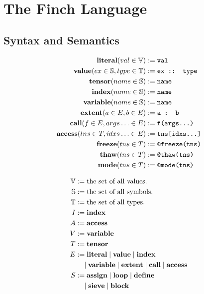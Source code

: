 
\section{The Finch Language}

\subsection{Syntax and Semantics}

\noindent %
\begin{minipage}{0.4\linewidth}
\begin{align*}
    \text{\textbf{literal}}(val \in \mathbb{V}) &:= \text{\texttt{val}} \\
    \text{\textbf{value}}(ex \in \mathbb{S}, type \in \mathbb{T}) &:= \text{\texttt{ex :: type}} \\
    \text{\textbf{tensor}}(name \in \mathbb{S}) &:= \text{\texttt{name}} \\
    \text{\textbf{index}}(name \in \mathbb{S}) &:= \text{\texttt{name}} \\
    \text{\textbf{variable}}(name \in \mathbb{S}) &:= \text{\texttt{name}} \\
    \text{\textbf{extent}}(a \in E, b \in E) &:= \text{\texttt{a : b}} \\
    \text{\textbf{call}}(f \in E, args\ldots \in E) &:= \text{\texttt{f(args...)}} \\
    \text{\textbf{access}}(tns \in T, idxs\ldots \in E) &:= \text{\texttt{tns[idxs...]}} \\
    \text{\textbf{freeze}}(tns \in T) &:= \text{\texttt{@freeze(tns)}} \\
    \text{\textbf{thaw}}(tns \in T) &:= \text{\texttt{@thaw(tns)}} \\
    \text{\textbf{mode}}(tns \in T) &:= \text{\texttt{@mode(tns)}} \\
\end{align*}
\end{minipage}%
\begin{minipage}{0.5\linewidth}
\begin{align*}
    \mathbb{V} &:= \text{the set of all values.} \\
    \mathbb{S} &:= \text{the set of all symbols.} \\
    \mathbb{T} &:= \text{the set of all types.} \\
    I &:= \text{\textbf{index}} \\
    A &:= \text{\textbf{access}} \\
    V &:= \text{\textbf{variable}} \\
    T &:= \text{\textbf{tensor}} \\
    E &:= \text{\textbf{literal}} \mid \text{\textbf{value}} \mid \text{\textbf{index}} \\
        &\quad \mid \text{\textbf{variable}} \mid \text{\textbf{extent}} \mid \text{\textbf{call}} \mid \text{\textbf{access}} \\
    S &:= \text{\textbf{assign}} \mid \text{\textbf{loop}} \mid \text{\textbf{define}} \\
        &\quad \mid \text{\textbf{sieve}} \mid \text{\textbf{block}} \\
\end{align*}
\end{minipage}%
